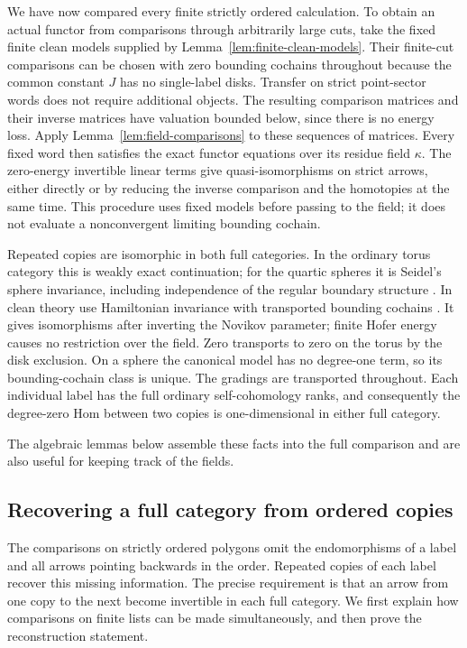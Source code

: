 \documentclass[11pt]{article}
\numberwithin{equation}{section}
\theoremstyle{definition}
\theoremstyle{remark}
\begin{document}
We have now compared every finite strictly ordered calculation.
To obtain an actual functor from comparisons through arbitrarily
large cuts, take the fixed finite clean models supplied by
Lemma~\ref{lem:finite-clean-models}.  Their finite-cut
comparisons can be chosen with zero bounding cochains throughout
because the common constant $J$ has no single-label disks.
Transfer on strict point-sector words does not require
additional objects.  The resulting comparison matrices and
their inverse matrices have valuation bounded below, since
there is no energy loss.  Apply Lemma~\ref{lem:field-comparisons}
to these sequences of matrices.  Every fixed word then satisfies
the exact functor equations over its residue field $\kappa$.
The zero-energy invertible linear terms give quasi-isomorphisms
on strict arrows, either directly or by reducing the inverse
comparison and the homotopies at the same time.  This procedure
uses fixed models before passing to the field; it does not
evaluate a nonconvergent limiting bounding cochain.

Repeated copies are isomorphic in both full categories.  In the
ordinary torus category this is weakly exact continuation; for
the quartic spheres it is Seidel's sphere invariance, including
independence of the regular boundary structure
\cite[Lemma~8.14]{HMS:SeidelQuartic}.  In clean theory use
Hamiltonian invariance with transported bounding cochains
\cite[Section~15]{Floer:Fukaya}.  It gives isomorphisms after
inverting the Novikov parameter; finite Hofer energy causes
no restriction over the field.  Zero transports to zero on
the torus by the disk exclusion.  On a sphere the canonical
model has no degree-one term, so its bounding-cochain class
is unique.  The gradings are transported throughout.  Each
individual label has the full ordinary self-cohomology ranks,
and consequently the degree-zero Hom between two copies is
one-dimensional in either full category.

The algebraic lemmas below assemble these facts into the full
comparison and are also useful for keeping track of the fields.

\subsection{Recovering a full category from ordered copies}
\label{subsec:ordered-reconstruction}

The comparisons on strictly ordered polygons omit the endomorphisms of a
label and all arrows pointing backwards in the order.  Repeated copies of
each label recover this missing information.  The precise requirement is
that an arrow from one copy to the next become invertible in each full
category.  We first explain how comparisons on finite lists can be made
simultaneously, and then prove the reconstruction statement.
\end{document}
